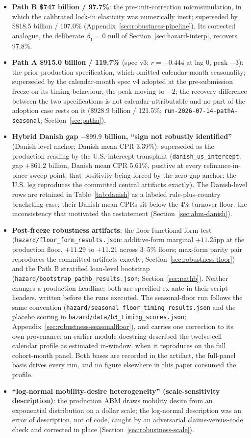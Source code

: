 \documentclass[12pt]{article}
\begin{document}
\begin{itemize}
\item \textbf{Path B \$747 billion / 97.7\%}: the pre-unit-correction microsimulation, in which the calibrated lock-in elasticity was numerically inert; superseded by \$818.5 billion / 107.0\% (Appendix~\ref{sec:robustness-pipeline}). Its corrected analogue, the deliberate $\beta_1 = 0$ null of Section~\ref{sec:hazard-interp}, recovers 97.8\%.
\item \textbf{Path A \$915.0 billion / 119.7\%} (spec v3; $r = -0.444$ at lag 0, peak $-3$): the prior production specification, which omitted calendar-month seasonality; superseded by the calendar-month spec v4 adopted at the pre-submission freeze on its timing behaviour, the peak moving to $-2$; the recovery difference between the two specifications is not calendar-attributable and no part of the adoption case rests on it (\$928.9 billion / 121.5\%; \texttt{run-2026-07-14-pathA-seasonal}; Section~\ref{sec:patha}).
\item \textbf{Hybrid Danish gap $-\$99.9$ billion, ``sign not robustly identified''} (Danish-level anchor; Danish mean CPR 3.39\%): superseded as the production reading by the U.S.-intercept transplant (\texttt{danish\_us\_intercept}: gap $+\$61.2$ billion, Danish mean CPR 5.61\%, positive at every refinance-in-place sweep point, that positivity being forced by the zero-gap anchor; the U.S. leg reproduces the committed central artifacts exactly). The Danish-level rows are retained in Table~\ref{tab:danish} as a labeled rule-plus-country bracketing case; their Danish mean CPRs sit below the 4\% turnover floor, the inconsistency that motivated the restatement (Section~\ref{sec:abm-danish}).
\item \textbf{Post-freeze robustness artifacts}: the floor functional-form test (\texttt{hazard/floor\_form\_results.json}: additive-form marginal $+11.25$pp at the production floor, $+11.29$ to $+11.21$ across 3--5\% floors; max-form parity pair reproduces the committed artifacts exactly; Section~\ref{sec:robustness-floor}) and the Path B stratified loan-level bootstrap (\texttt{hazard/bootstrap\_pathb\_results.json}; Section~\ref{sec:pathb}). Neither changes a production headline; both are specified ex ante in their script headers, written before the runs executed. The seasonal-floor run follows the same convention (\texttt{hazard/seasonal\_floor\_timing\_results.json} and the placebo scoring in \texttt{hazard/data/b3\_timing\_scores.json}; Appendix~\ref{sec:robustness-seasonalfloor}), and carries one correction to its own provenance: an earlier module docstring described the twelve-cell calendar profile as estimated in-window, when it reproduces on the full cohort-month panel. Both bases are recorded in the artifact, the full-panel basis drives every run, and no figure elsewhere in this paper consumed the profile.
\item \textbf{``log-normal mobility-desire heterogeneity'' (scale-sensitivity description)}: the production ABM draws mobility desire from an exponential distribution on a dollar scale; the log-normal description was an error of description, not of code, caught by an adversarial claims-versus-code check and corrected in place (Section~\ref{sec:robustness-scale}).
\end{itemize}
\endgroup
\end{document}
